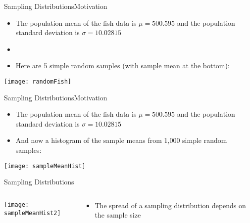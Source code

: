 \documentclass[xcolor=dvipsnames]{beamer}
\begin{document}
\begin{frame}{Sampling Distributions}{Motivation}
	\begin{itemize}
		\item The population mean of the fish data is $\mu = 500.595$ and the population standard deviation is $\sigma = 10.02815$
		\item[]
		\item Here are 5 simple random samples (with sample mean at the bottom):
	\end{itemize}
	\begin{center}
		\texttt{[image: randomFish]}
	\end{center}
\end{frame}

\begin{frame}{Sampling Distributions}{Motivation}
	\begin{itemize}
		\item The population mean of the fish data is $\mu = 500.595$ and the population standard deviation is $\sigma = 10.02815$
		\item And now a histogram of the sample means from 1,000 simple random samples:
	\end{itemize}
	\begin{center}
		\texttt{[image: sampleMeanHist]}
	\end{center}
\end{frame}

\begin{frame}{Sampling Distributions}
	\begin{columns}
		\begin{column}{.7 \textwidth}
			\begin{center}
				\texttt{[image: sampleMeanHist2]}
			\end{center}
		\end{column}
		\begin{column}{.3 \textwidth}
			\begin{itemize}
				\item The spread of a sampling distribution depends on the sample size
			\end{itemize}
		\end{column}
	\end{columns}
\end{frame}
\end{document}
